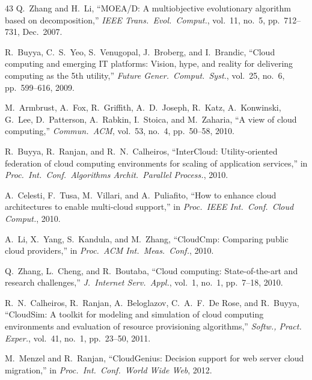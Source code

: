 \documentclass[journal]{IEEEtran}
\begin{document}
\begin{thebibliography}{43}
Q.~Zhang and H.~Li, ``MOEA/D: A multiobjective evolutionary algorithm based on
  decomposition,'' \emph{IEEE Trans.\ Evol.\ Comput.}, vol.~11, no.~5,
  pp.~712--731, Dec.~2007.

R.~Buyya, C.~S.~Yeo, S.~Venugopal, J.~Broberg, and I.~Brandic, ``Cloud
  computing and emerging IT platforms: Vision, hype, and reality for delivering
  computing as the 5th utility,'' \emph{Future Gener.\ Comput.\ Syst.},
  vol.~25, no.~6, pp.~599--616, 2009.

M.~Armbrust, A.~Fox, R.~Griffith, A.~D.~Joseph, R.~Katz, A.~Konwinski,
  G.~Lee, D.~Patterson, A.~Rabkin, I.~Stoica, and M.~Zaharia, ``A view of
  cloud computing,'' \emph{Commun.\ ACM}, vol.~53, no.~4, pp.~50--58, 2010.

R.~Buyya, R.~Ranjan, and R.~N.~Calheiros, ``InterCloud: Utility-oriented
  federation of cloud computing environments for scaling of application
  services,'' in \emph{Proc.\ Int.\ Conf.\ Algorithms Archit.\ Parallel
  Process.}, 2010.

A.~Celesti, F.~Tusa, M.~Villari, and A.~Puliafito, ``How to enhance cloud
  architectures to enable multi-cloud support,'' in \emph{Proc.\ IEEE Int.\
  Conf.\ Cloud Comput.}, 2010.

A.~Li, X.~Yang, S.~Kandula, and M.~Zhang, ``CloudCmp: Comparing public cloud
  providers,'' in \emph{Proc.\ ACM Int.\ Meas.\ Conf.}, 2010.

Q.~Zhang, L.~Cheng, and R.~Boutaba, ``Cloud computing: State-of-the-art and
  research challenges,'' \emph{J.\ Internet Serv.\ Appl.}, vol.~1, no.~1,
  pp.~7--18, 2010.

\bibitem{calheiros_cloudsim}
R.~N.~Calheiros, R.~Ranjan, A.~Beloglazov, C.~A.~F.~De Rose, and R.~Buyya,
  ``CloudSim: A toolkit for modeling and simulation of cloud computing
  environments and evaluation of resource provisioning algorithms,''
  \emph{Softw., Pract. Exper.}, vol.~41, no.~1, pp.~23--50, 2011.

\bibitem{menzel_cloudgenius}
M.~Menzel and R.~Ranjan, ``CloudGenius: Decision support for web server cloud
  migration,'' in \emph{Proc.\ Int.\ Conf.\ World Wide Web}, 2012.


\end{thebibliography}
\end{document}
